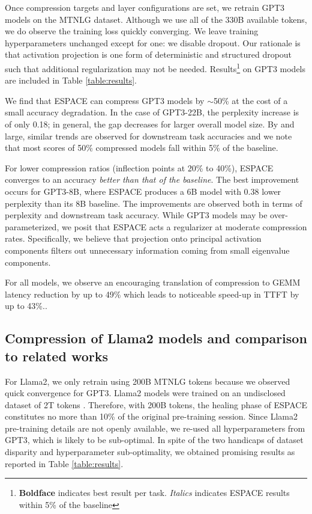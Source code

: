 \documentclass{article}
\theoremstyle{plain}
\begin{document}
Once compression targets and layer configurations are set, we retrain GPT3 models on the MTNLG dataset. Although we use all of the 330B available tokens, we do observe the training loss quickly converging. We leave training hyperparameters unchanged except for one: we disable dropout. Our rationale is that activation projection is one form of deterministic and structured dropout such that additional regularization may not be needed. Results\footnote{\label{fn:typset}\textbf{Boldface} indicates best result per task. \textit{Italics} indicates ESPACE results within 5\% of the baseline} on GPT3 models are included in Table \ref{table:results}.

We find that ESPACE can compress GPT3 models by $\sim$50\% at the cost of a small accuracy degradation. In the case of GPT3-22B, the perplexity increase is of only 0.18; in general, the gap decreases for larger overall model size. By and large, similar trends are observed for downstream task accuracies and we note that most scores of 50\% compressed models fall within 5\% of the baseline.

For lower compression ratios (inflection points at 20\% to 40\%), ESPACE converges to an accuracy \emph{better than that of the baseline}. The best improvement occurs for GPT3-8B, where ESPACE produces a 6B model with 0.38 lower perplexity than its 8B baseline. The improvements are observed both in terms of perplexity and downstream task accuracy. While GPT3 models may be over-parameterized, we posit that ESPACE acts a regularizer at moderate compression rates. Specifically, we believe that projection onto principal activation components filters out unnecessary information coming from small eigenvalue components.

For all models, we observe an encouraging translation of compression to GEMM latency reduction {by up to 49\%} which leads to noticeable speed-up in TTFT { by up to 43\%}..

\subsection{Compression of Llama2 models and comparison to related works}
For Llama2, we only retrain using 200B MTNLG tokens because we observed quick convergence for GPT3. Llama2 models were trained on an undisclosed dataset of 2T tokens \cite{touvron2023llama}. Therefore, with 200B tokens, the healing phase of ESPACE constitutes no more than 10\% of the original pre-training session.
Since Llama2 pre-training details are not openly available, we re-used all hyperparameters from GPT3, which is likely to be sub-optimal. In spite of the two handicaps of dataset disparity and hyperparameter sub-optimality, we obtained promising results as reported in Table \ref{table:results}.
\end{document}

